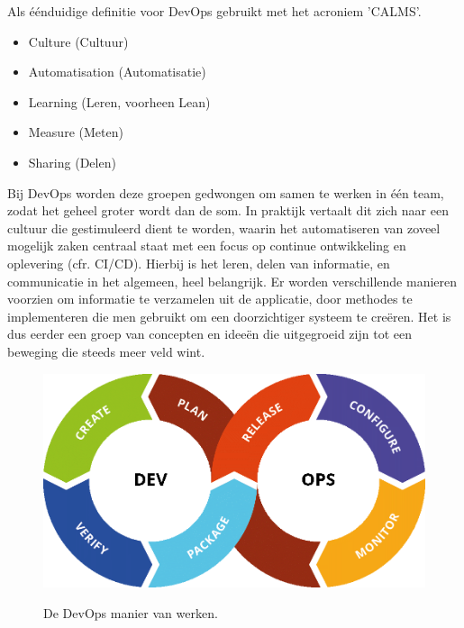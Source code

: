 Als éénduidige definitie voor DevOps gebruikt met het acroniem 'CALMS'.
\begin{itemize}[noitemsep]
	\item Culture (Cultuur)
	\item Automatisation (Automatisatie)
	\item Learning (Leren, voorheen Lean)
	\item Measure (Meten)
	\item Sharing (Delen)
\end{itemize}

Bij DevOps worden deze groepen gedwongen om samen te werken in één team, zodat het geheel groter wordt dan de som. In praktijk vertaalt dit zich naar een cultuur die gestimuleerd dient te worden, waarin het automatiseren van zoveel mogelijk zaken centraal staat met een focus op continue ontwikkeling en oplevering (cfr. CI/CD). Hierbij is het leren, delen van informatie, en communicatie in het algemeen, heel belangrijk. Er worden verschillende manieren voorzien om informatie te verzamelen uit de applicatie, door methodes te implementeren die men gebruikt om een doorzichtiger systeem te creëren. Het is dus eerder een groep van concepten en ideeën die uitgegroeid zijn tot een beweging die steeds meer veld wint.

\begin{figure}
	\centering
	\caption{De DevOps manier van werken.}
	\includegraphics[scale=0.5]{img/devops.png}
	\label{fig:devopsway}
\end{figure}

\autocite{Ernest2017}

